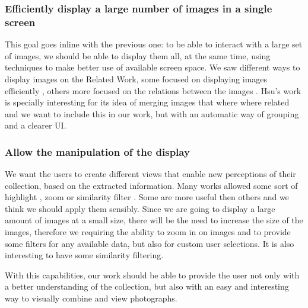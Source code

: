 \subsubsection{Efficiently display a large number of images in a single screen} %
This goal goes inline with the previous one: to be able to interact with a large set of images, we should be able to display them all, at the same time, using techniques to make better use of available screen space. We saw different ways to display images on the Related Work, some focused on displaying images efficiently \cite{Qiu:2007p1207,Rodden:2001p731,Naaman:2004p1802,Hsu:2009p2696,Bederson:2001:PZI:502348.502359}, others more focused on the relations between the images \cite{Girgensohn:2009:MOP:1502650.1502711,Heesch:2004p2675}. Hsu's work \cite{Hsu:2009p2696} is specially interesting for its idea of merging images that where where related and we want to include this in our work, but with an automatic way of grouping and a clearer \ac{UI}.

\subsubsection{Allow the manipulation of the display}
We want the users to create different views that enable new perceptions of their collection, based on the extracted information. Many works allowed some sort of highlight \cite{Girgensohn:2009:MOP:1502650.1502711}, zoom \cite{Bederson:2001:PZI:502348.502359} or similarity filter \cite{Qiu:2007p1207,Heesch:2004p2675}. Some are more useful then others and we think we should apply them sensibly. Since we are going to display a large amount of images at a small size, there will be the need to increase the size of the images, therefore we requiring the ability to zoom in on images and to provide some filters for any available data, but also for custom user selections. It is also interesting to have some similarity filtering.
	
\vspace{\baselineskip}
	
With this capabilities, our work should be able to provide the user not only with a better understanding of the collection, but also with an easy and interesting way to visually combine and view photographs.



